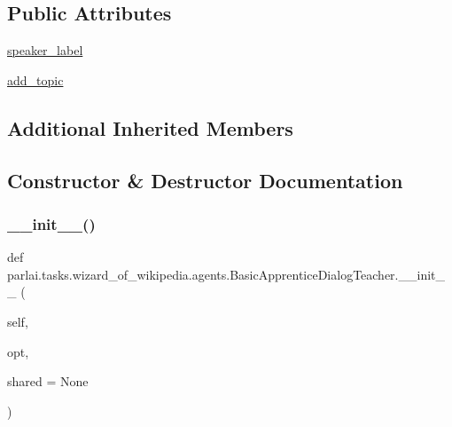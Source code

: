 \subsection*{Public Attributes}
\begin{DoxyCompactItemize}
\item 
\hyperlink{classparlai_1_1tasks_1_1wizard__of__wikipedia_1_1agents_1_1BasicApprenticeDialogTeacher_a68999910fbe14ab7c1e60e48b692480d}{speaker\+\_\+label}
\item 
\hyperlink{classparlai_1_1tasks_1_1wizard__of__wikipedia_1_1agents_1_1BasicApprenticeDialogTeacher_a7e627699dba099f69d5ce0b139caa02e}{add\+\_\+topic}
\end{DoxyCompactItemize}
\subsection*{Additional Inherited Members}


\subsection{Constructor \& Destructor Documentation}
\mbox{\label{classparlai_1_1tasks_1_1wizard__of__wikipedia_1_1agents_1_1BasicApprenticeDialogTeacher_ad8d773c291ac75c5ecd1ec1d3f2a0797}} 
\subsubsection{\texorpdfstring{\+\_\+\+\_\+init\+\_\+\+\_\+()}{\_\_init\_\_()}}
{\footnotesize\ttfamily def parlai.\+tasks.\+wizard\+\_\+of\+\_\+wikipedia.\+agents.\+Basic\+Apprentice\+Dialog\+Teacher.\+\_\+\+\_\+init\+\_\+\+\_\+ (\begin{DoxyParamCaption}\item[{}]{self,  }\item[{}]{opt,  }\item[{}]{shared = {\ttfamily None} }\end{DoxyParamCaption})}



